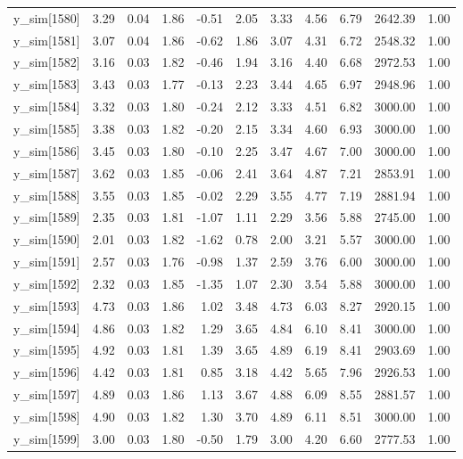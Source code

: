 \begin{table}[ht]
\begin{tabular}{rrrrrrrrrrr}
  y\_sim[1580] & 3.29 & 0.04 & 1.86 & -0.51 & 2.05 & 3.33 & 4.56 & 6.79 & 2642.39 & 1.00 \\ 
  y\_sim[1581] & 3.07 & 0.04 & 1.86 & -0.62 & 1.86 & 3.07 & 4.31 & 6.72 & 2548.32 & 1.00 \\ 
  y\_sim[1582] & 3.16 & 0.03 & 1.82 & -0.46 & 1.94 & 3.16 & 4.40 & 6.68 & 2972.53 & 1.00 \\ 
  y\_sim[1583] & 3.43 & 0.03 & 1.77 & -0.13 & 2.23 & 3.44 & 4.65 & 6.97 & 2948.96 & 1.00 \\ 
  y\_sim[1584] & 3.32 & 0.03 & 1.80 & -0.24 & 2.12 & 3.33 & 4.51 & 6.82 & 3000.00 & 1.00 \\ 
  y\_sim[1585] & 3.38 & 0.03 & 1.82 & -0.20 & 2.15 & 3.34 & 4.60 & 6.93 & 3000.00 & 1.00 \\ 
  y\_sim[1586] & 3.45 & 0.03 & 1.80 & -0.10 & 2.25 & 3.47 & 4.67 & 7.00 & 3000.00 & 1.00 \\ 
  y\_sim[1587] & 3.62 & 0.03 & 1.85 & -0.06 & 2.41 & 3.64 & 4.87 & 7.21 & 2853.91 & 1.00 \\ 
  y\_sim[1588] & 3.55 & 0.03 & 1.85 & -0.02 & 2.29 & 3.55 & 4.77 & 7.19 & 2881.94 & 1.00 \\ 
  y\_sim[1589] & 2.35 & 0.03 & 1.81 & -1.07 & 1.11 & 2.29 & 3.56 & 5.88 & 2745.00 & 1.00 \\ 
  y\_sim[1590] & 2.01 & 0.03 & 1.82 & -1.62 & 0.78 & 2.00 & 3.21 & 5.57 & 3000.00 & 1.00 \\ 
  y\_sim[1591] & 2.57 & 0.03 & 1.76 & -0.98 & 1.37 & 2.59 & 3.76 & 6.00 & 3000.00 & 1.00 \\ 
  y\_sim[1592] & 2.32 & 0.03 & 1.85 & -1.35 & 1.07 & 2.30 & 3.54 & 5.88 & 3000.00 & 1.00 \\ 
  y\_sim[1593] & 4.73 & 0.03 & 1.86 & 1.02 & 3.48 & 4.73 & 6.03 & 8.27 & 2920.15 & 1.00 \\ 
  y\_sim[1594] & 4.86 & 0.03 & 1.82 & 1.29 & 3.65 & 4.84 & 6.10 & 8.41 & 3000.00 & 1.00 \\ 
  y\_sim[1595] & 4.92 & 0.03 & 1.81 & 1.39 & 3.65 & 4.89 & 6.19 & 8.41 & 2903.69 & 1.00 \\ 
  y\_sim[1596] & 4.42 & 0.03 & 1.81 & 0.85 & 3.18 & 4.42 & 5.65 & 7.96 & 2926.53 & 1.00 \\ 
  y\_sim[1597] & 4.89 & 0.03 & 1.86 & 1.13 & 3.67 & 4.88 & 6.09 & 8.55 & 2881.57 & 1.00 \\ 
  y\_sim[1598] & 4.90 & 0.03 & 1.82 & 1.30 & 3.70 & 4.89 & 6.11 & 8.51 & 3000.00 & 1.00 \\ 
  y\_sim[1599] & 3.00 & 0.03 & 1.80 & -0.50 & 1.79 & 3.00 & 4.20 & 6.60 & 2777.53 & 1.00 \\ 

\end{tabular}
\end{table}

